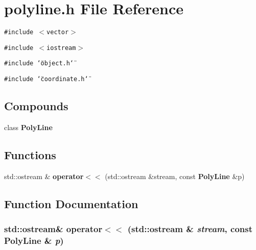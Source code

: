 \section{polyline.h File Reference}
\label{polyline_8h}
{\tt \#include $<$vector$>$}\par
{\tt \#include $<$iostream$>$}\par
{\tt \#include \char`\"{}object.h\char`\"{}}\par
{\tt \#include \char`\"{}coordinate.h\char`\"{}}\par
\subsection*{Compounds}
\begin{CompactItemize}
\item 
class {\bf Poly\-Line}
\end{CompactItemize}
\subsection*{Functions}
\begin{CompactItemize}
\item 
std::ostream \& {\bf operator$<$$<$} (std::ostream \&stream, const {\bf Poly\-Line} \&p)
\end{CompactItemize}


\subsection{Function Documentation}
\subsubsection{\setlength{\rightskip}{0pt plus 5cm}std::ostream\& operator$<$$<$ (std::ostream \& {\em stream}, const {\bf Poly\-Line} \& {\em p})\hspace{0.3cm}{\tt  [inline]}}\label{polyline_8h_a0}


